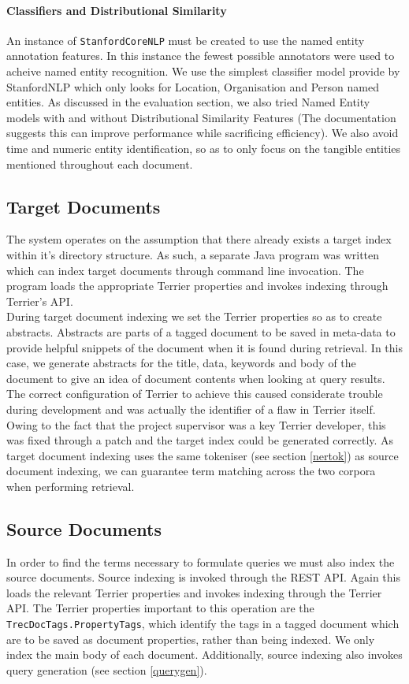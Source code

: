 \documentclass{l4proj}
\newcommand{\code}[1]{\texttt{#1}}
\begin{document}
\paragraph{Classifiers and Distributional Similarity} \label{classifiers}
An instance of \code{StanfordCoreNLP} must be created to use the named entity annotation features.
In this instance the fewest possible annotators were used to acheive named entity recognition.
We use the simplest classifier model provide by StanfordNLP which only looks for Location, Organisation and Person named entities.
As discussed in the evaluation section, we also tried Named Entity models with and without Distributional Similarity Features (The documentation suggests this can improve performance while sacrificing efficiency).
We also avoid time and numeric entity identification, so as to only focus on the tangible entities mentioned throughout each document.

\subsection{Target Documents}
The system operates on the assumption that there already exists a target index within it's directory structure.
As such, a separate Java program was written which can index target documents through command line invocation. The program loads the appropriate Terrier properties and invokes indexing through Terrier's API. \\ During target document indexing we set the Terrier properties so as to create abstracts. Abstracts are parts of a tagged document to be saved in meta-data to provide helpful snippets of the document when it is found during retrieval. In this case, we generate abstracts for the title, data, keywords and body of the document to give an idea of document contents when looking at query results.
The correct configuration of Terrier to achieve this caused considerate trouble during development and was actually the identifier of a flaw in Terrier itself. Owing to the fact that the project supervisor was a key Terrier developer, this was fixed through a patch and the target index could be generated correctly.
As target document indexing uses the same tokeniser (see section \ref{nertok}) as source document indexing, we can guarantee term matching across the two corpora when performing retrieval.

\subsection{Source Documents}
In order to find the terms necessary to formulate queries we must also index the source documents.
Source indexing is invoked through the REST API. Again this loads the relevant Terrier properties and invokes indexing through the Terrier API. The Terrier properties important to this operation are the \code{TrecDocTags.PropertyTags}, which identify the tags in a tagged document which are to be saved as document properties, rather than being indexed. We only index the main body of each document. Additionally, source indexing also invokes query generation (see section \ref{querygen}). 
\end{document}

